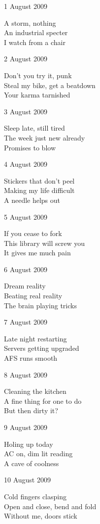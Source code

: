 \documentclass[12pt]{article}
\begin{document}
1 August 2009

A storm, nothing \\
An industrial specter \\
I watch from a chair

2 August 2009

Don't you try it, punk \\
Steal my bike, get a beatdown \\
Your karma tarnished

3 August 2009

Sleep late, still tired \\
The week just new already \\
Promises to blow

\newpage

4 August 2009

Stickers that don't peel \\
Making my life difficult \\
A needle helps out

5 August 2009

If you cease to fork \\
This library will screw you \\
It gives me much pain

6 August 2009

Dream reality \\
Beating real reality \\
The brain playing tricks

7 August 2009

Late night restarting \\
Servers getting upgraded \\
AFS runs smooth
 
 8 August 2009

 Cleaning the kitchen \\
 A fine thing for one to do \\
 But then dirty it?

 9 August 2009

 Holing up today \\
 AC on, dim lit reading \\
 A cave of coolness

 10 August 2009

 Cold fingers clasping \\
 Open and close, bend and fold \\
 Without me, doors stick


\newpage
\end{document}
